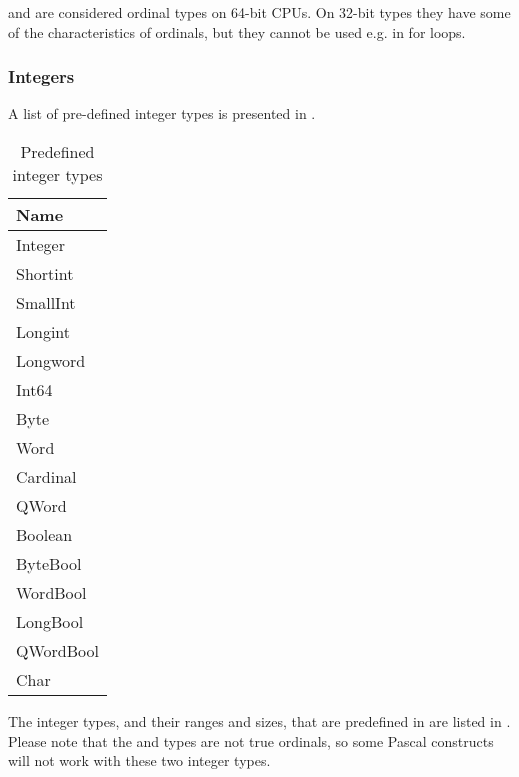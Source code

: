 \begin{remark}
 and  are considered ordinal types on 64-bit CPUs. On 32-bit types
they have some of the characteristics of ordinals, but they cannot be used
e.g. in for loops.
\end{remark}

\subsubsection{Integers}
A list of pre-defined integer types is presented in .

    
   
   
	 
   
    
   
   

%
\begin{table}[ht]
\caption{Predefined integer types}
\label{tab:integerstyp}
\begin{center}
\begin{tabular}{l}
Name\\ \hline
Integer \\
Shortint \\
SmallInt \\
Longint \\
Longword \\
Int64 \\
Byte \\
Word \\
Cardinal \\
QWord \\
Boolean \\
ByteBool \\
WordBool \\
LongBool \\
QWordBool \\
Char \\ \hline
\end{tabular}
\end{center}
\end{table}
The integer types, and their ranges and sizes, that are predefined in
\fpc are listed in . Please note that
the  and  types are not true ordinals, so
some Pascal constructs will not work with these two integer types.

